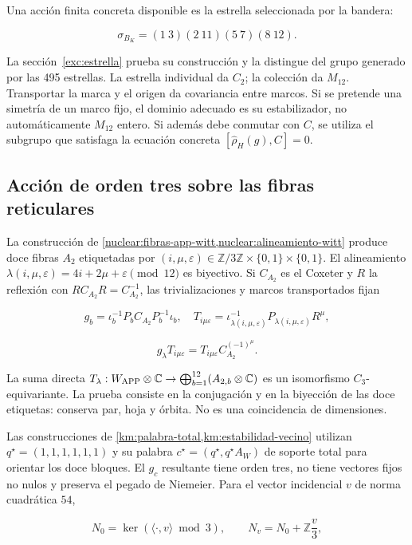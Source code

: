 Una acción finita concreta disponible es la estrella seleccionada por la bandera:

\[
\sigma_{B_K}=(1\ 3)(2\ 11)(5\ 7)(8\ 12).
\]

La sección~\ref{exc:estrella} prueba su construcción y la distingue del grupo generado por las 495 estrellas. La estrella individual da \(C_2\); la colección da \(M_{12}\). Transportar la marca y el origen da covariancia entre marcos. Si se pretende una simetría de un marco fijo, el dominio adecuado es su estabilizador, no automáticamente \(M_{12}\) entero. Si además debe conmutar con \(C\), se utiliza el subgrupo que satisfaga la ecuación concreta \([\widehat\rho_H(g),C]=0\).

\subsection{Acción de orden tres sobre las fibras reticulares}\label{nuc04:c3}

La construcción de \cref{nuclear:fibras-app-witt,nuclear:alineamiento-witt} produce doce fibras \(A_2\) etiquetadas por \((i,\mu,\varepsilon)\in\mathbb Z/3\mathbb Z\times\{0,1\}\times\{0,1\}\). El alineamiento \(\lambda(i,\mu,\varepsilon)=4i+2\mu+\varepsilon\pmod{12}\) es biyectivo. Si \(C_{A_2}\) es el Coxeter y \(R\) la reflexión con \(RC_{A_2}R=C_{A_2}^{-1}\), las trivializaciones y marcos transportados fijan

\[
g_b=\iota_b^{-1}P_bC_{A_2}P_b^{-1}\iota_b,
\quad T_{i\mu\varepsilon}=\iota_{\lambda(i,\mu,\varepsilon)}^{-1}P_{\lambda(i,\mu,\varepsilon)}R^\mu,
\]

\[
g_\lambda T_{i\mu\varepsilon}
=T_{i\mu\varepsilon}C_{A_2}^{(-1)^\mu}.
\]

La suma directa \(T_\lambda:W_{\rm APP}\otimes\mathbb C\to\bigoplus_{b=1}^{12}(A_{2,b}\otimes\mathbb C)\) es un isomorfismo \(C_3\)-equivariante. La prueba consiste en la conjugación y en la biyección de las doce etiquetas: conserva par, hoja y órbita. No es una coincidencia de dimensiones.

Las construcciones de \cref{km:palabra-total,km:estabilidad-vecino} utilizan \(q^\star=(1,1,1,1,1,1)\) y su palabra \(c^\star=(q^\star,q^\star A_W)\) de soporte total para orientar los doce bloques. El \(g_c\) resultante tiene orden tres, no tiene vectores fijos no nulos y preserva el pegado de Niemeier. Para el vector incidencial \(v\) de norma cuadrática \(54\),

\[
N_0=\ker(\langle\cdot,v\rangle\bmod3),\qquad
N_v=N_0+\mathbb Z\frac v3,
\]

